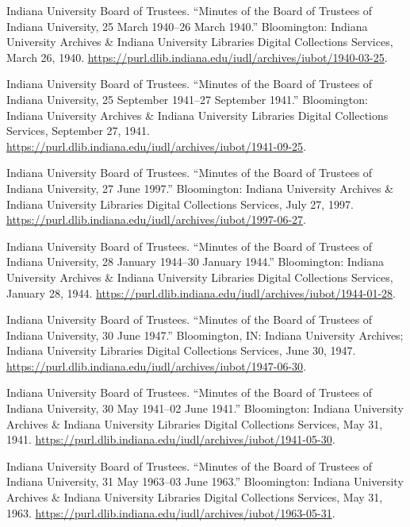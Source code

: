 \documentclass[
  american,
  letterpaper,
]{scrreprt}
\newlength{\cslhangindent}
\newenvironment{CSLReferences}[2] %
 {\begin{list}{}{%
  \setlength{\itemindent}{0pt}
  \setlength{\leftmargin}{0pt}
  \setlength{\parsep}{0pt}
  \ifodd #1
   \setlength{\leftmargin}{\cslhangindent}
   \setlength{\itemindent}{-1\cslhangindent}
  \fi
  \setlength{\itemsep}{#2\baselineskip}}}
 {\end{list}}
\begin{document}
\begin{CSLReferences}{1}{0}
Indiana University Board of Trustees. {``Minutes of the Board of
Trustees of Indiana University, 25 March 1940--26 March 1940.''}
Bloomington: Indiana University Archives \& Indiana University Libraries
Digital Collections Services, March 26, 1940.
\url{https://purl.dlib.indiana.edu/iudl/archives/iubot/1940-03-25}.

Indiana University Board of Trustees. {``Minutes of the Board of
Trustees of Indiana University, 25 September 1941--27 September 1941.''}
Bloomington: Indiana University Archives \& Indiana University Libraries
Digital Collections Services, September 27, 1941.
\url{https://purl.dlib.indiana.edu/iudl/archives/iubot/1941-09-25}.

Indiana University Board of Trustees. {``Minutes of the Board of
Trustees of Indiana University, 27 June 1997.''} Bloomington: Indiana
University Archives \& Indiana University Libraries Digital Collections
Services, July 27, 1997.
\url{https://purl.dlib.indiana.edu/iudl/archives/iubot/1997-06-27}.

Indiana University Board of Trustees. {``Minutes of the Board of
Trustees of Indiana University, 28 January 1944--30 January 1944.''}
Bloomington: Indiana University Archives \& Indiana University Libraries
Digital Collections Services, January 28, 1944.
\url{https://purl.dlib.indiana.edu/iudl/archives/iubot/1944-01-28}.

Indiana University Board of Trustees. {``Minutes of the Board of
Trustees of Indiana University, 30 June 1947.''} Bloomington, IN:
Indiana University Archives; Indiana University Libraries Digital
Collections Services, June 30, 1947.
\url{https://purl.dlib.indiana.edu/iudl/archives/iubot/1947-06-30}.

Indiana University Board of Trustees. {``Minutes of the Board of
Trustees of Indiana University, 30 May 1941--02 June 1941.''}
Bloomington: Indiana University Archives \& Indiana University Libraries
Digital Collections Services, May 31, 1941.
\url{https://purl.dlib.indiana.edu/iudl/archives/iubot/1941-05-30}.

Indiana University Board of Trustees. {``Minutes of the Board of
Trustees of Indiana University, 31 May 1963--03 June 1963.''}
Bloomington: Indiana University Archives \& Indiana University Libraries
Digital Collections Services, May 31, 1963.
\url{https://purl.dlib.indiana.edu/iudl/archives/iubot/1963-05-31}.


\end{CSLReferences}
\end{document}
